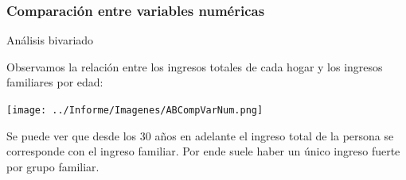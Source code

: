\documentclass[pdf]{beamer}
\def\\{}%
\begin{document}


 
    \subsubsection{Comparación entre variables numéricas}

\begin{frame}{Análisis bivariado}

    Observamos la relación entre los ingresos totales de cada hogar y los ingresos familiares por edad:
    \begin{center}
        \texttt{[image: ../Informe/Imagenes/ABCompVarNum.png]}
    \end{center}
    Se puede ver que desde los 30 años en adelante el ingreso total de la persona se corresponde con el ingreso familiar. Por ende suele haber un único ingreso fuerte por grupo familiar.

\end{frame}
 
\end{document}
